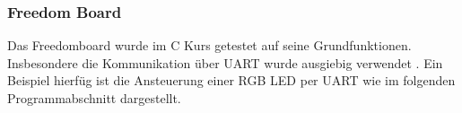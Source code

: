 \subsubsection{Freedom Board}
Das Freedomboard wurde im C Kurs getestet auf seine Grundfunktionen.
Insbesondere die Kommunikation über UART wurde ausgiebig verwendet
\cite{ninuxC}. Ein Beispiel hierfüg ist die Ansteuerung einer RGB LED
per UART wie im folgenden Programmabschnitt dargestellt.




